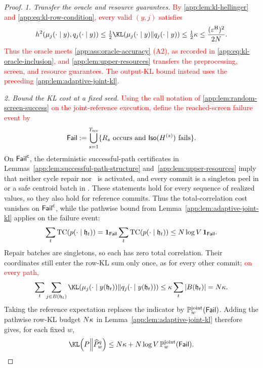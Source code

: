 \begin{proof}

\emph{1. Transfer the oracle and resource guarantees.}
\textcolor{red}{By \cref{app:lem:kl-hellinger} and
\eqref{app:eq:kl-row-condition}, every valid $(y,j)$ satisfies}
{\color{red}
\[
 \sqHellinger(\ExactRow{y}{j},\OracleRow{y}{j})
 \le\tfrac12\KLDivergence{\ExactRow{y}{j}}{\OracleRow{y}{j}}
 \le\tfrac12\KLRowBudget
 \le\frac{(\OracleRadius)^2}{2N}.
\]
}
\textcolor{red}{Thus the oracle meets \cref{app:ass:oracle-accuracy} (A2),
as recorded in \eqref{app:eq:kl-oracle-inclusion}, and
\cref{app:lem:upper-resources} transfers the preprocessing, screen, and
resource guarantees.  The output-KL bound instead uses the preceding
\cref{app:lem:adaptive-joint-kl}.}


\emph{2. Bound the KL cost at a fixed seed.}
\textcolor{red}{Using the call notation of
\cref{app:lem:random-screen-success} on the joint-reference execution,
define the reached-screen failure event by}
{\color{red}
\[
 \mathsf{Fail}
 :=\bigcup_{s=1}^{T_{\mathrm{scr}}}
   \{R_s\text{ occurs and }\mathsf{Iso}(H^{(s)})\text{ fails}\}.
\]
}
On $\mathsf{Fail}^{\mathsf c}$, the deterministic successful-path
certificates in Lemmas~\ref{app:lem:successful-path-structure}
and~\ref{app:lem:upper-resources} imply that neither cycle repair nor
\AlgoGuardRef\ is activated, and every commit is a singleton peel in
 or a safe
centroid batch in .  These statements hold
for every sequence of realized values, so they also hold for reference
commits.  Thus the total-correlation cost vanishes on
$\mathsf{Fail}^{\mathsf c}$, while the pathwise bound from
Lemma~\ref{app:lem:adaptive-joint-kl} applies on the failure event:
\[
 \sum_t\mathrm{TC}(p(\cdot\mid \mathfrak h_t))
 =\mathbf 1_{\mathsf{Fail}}
   \sum_t\mathrm{TC}(p(\cdot\mid \mathfrak h_t))
 \le N\log V\,\mathbf 1_{\mathsf{Fail}}.
\]
Repair batches are singletons, so each has zero total correlation.
Their coordinates still enter the row-KL sum only once, as for every
other commit; \textcolor{red}{on every path,}
{\color{red}
\[
 \sum_t\sum_{j\in B(\mathfrak h_t)}
 \KLDivergence{\ExactRow{y(\mathfrak h_t)}{j}}
              {\OracleRow{y(\mathfrak h_t)}{j}}
 \le\KLRowBudget\sum_t|B(\mathfrak h_t)|
 =N\KLRowBudget.
\]
}
Taking the reference expectation replaces the indicator by
$\mathbb P_{w}^{\mathrm{joint}}(\mathsf{Fail})$.  Adding the pathwise row-KL
budget $N\kappa$ in Lemma~\ref{app:lem:adaptive-joint-kl} therefore
gives, for each fixed $w$,
\begin{equation}
 \KLDivergence{\TargetLaw}{\SamplerOutputLaw{w}{\FrozenOracle}}
 \le N\KLRowBudget
   +N\log\VocabSize\,\JointReferenceLaw{w}(\ScreenFailureEvent).
 \label{app:eq:kl-fixed-seed-failure}
\end{equation}



\end{proof}
